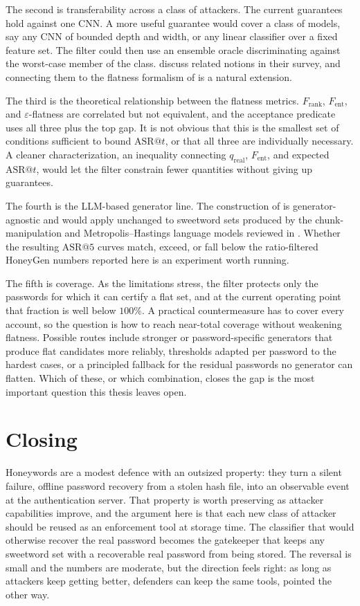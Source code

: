 The second is transferability across a class of attackers. The current
guarantees hold against one CNN. A more useful guarantee would cover a
class of models, say any CNN of bounded depth and width, or any linear
classifier over a fixed feature set. The filter could then use an
ensemble oracle discriminating against the worst-case member of the
class. \textcite{chakraborty2022hbat} discuss related notions in their
survey, and connecting them to the flatness formalism of
 is a natural extension.

The third is the theoretical relationship between the flatness metrics.
$F_{\text{rank}}$, $F_{\text{ent}}$, and $\varepsilon$-flatness are
correlated but not equivalent, and the acceptance predicate uses all
three plus the top gap. It is not obvious that this is the smallest set
of conditions sufficient to bound $\mathrm{ASR}@t$, or that all three
are individually necessary. A cleaner characterization, an inequality
connecting $q_{\text{real}}$, $F_{\text{ent}}$, and expected
$\mathrm{ASR}@t$, would let the filter constrain fewer quantities
without giving up guarantees.

The fourth is the LLM-based generator line. The construction of
 is generator-agnostic and would apply unchanged
to sweetword sets produced by the chunk-manipulation and
Metropolis--Hastings language models reviewed in
. Whether the resulting $\mathrm{ASR}@5$ curves
match, exceed, or fall below the ratio-filtered HoneyGen numbers
reported here is an experiment worth running.

The fifth is coverage. As the limitations stress, the filter protects
only the passwords for which it can certify a flat set, and at the
current operating point that fraction is well below $100\%$. A practical
countermeasure has to cover every account, so the question is how to
reach near-total coverage without weakening flatness. Possible routes
include stronger or password-specific generators that produce flat
candidates more reliably, thresholds adapted per password to the hardest
cases, or a principled fallback for the residual passwords no generator
can flatten. Which of these, or which combination, closes the gap is the
most important question this thesis leaves open.

\section{Closing}

Honeywords are a modest defence with an outsized property: they turn a
silent failure, offline password recovery from a stolen hash file, into
an observable event at the authentication server. That property is worth
preserving as attacker capabilities improve, and the argument here is
that each new class of attacker should be reused as an enforcement tool
at storage time. The classifier that would otherwise recover the real
password becomes the gatekeeper that keeps any sweetword set with a
recoverable real password from being stored. The reversal is small and
the numbers are moderate, but the direction feels right: as long as
attackers keep getting better, defenders can keep the same tools,
pointed the other way.